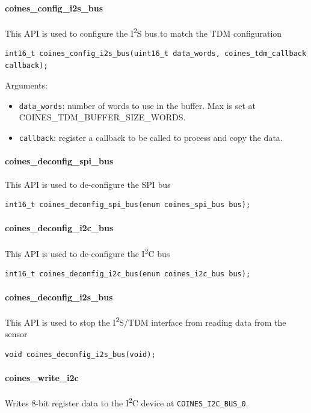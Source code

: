 \paragraph{coines\_config\_i2s\_bus}
This API is used to configure the I\textsuperscript{2}S bus to match the TDM configuration

\begin{lstlisting}
int16_t coines_config_i2s_bus(uint16_t data_words, coines_tdm_callback callback);
\end{lstlisting}

Arguments:
\begin{itemize}
	\item \texttt{data\_words}: number of words to use in the buffer. Max is set at COINES\_TDM\_BUFFER\_SIZE\_WORDS.
	\item \texttt{callback}: register a callback to be called to process and copy the data.
\end{itemize}

\paragraph{coines\_deconfig\_spi\_bus}
This API is used to de-configure the SPI bus

\begin{lstlisting}
int16_t coines_deconfig_spi_bus(enum coines_spi_bus bus);
\end{lstlisting}

\paragraph{coines\_deconfig\_i2c\_bus}
This API is used to de-configure the I\textsuperscript{2}C bus

\begin{lstlisting}
int16_t coines_deconfig_i2c_bus(enum coines_i2c_bus bus);
\end{lstlisting}

\paragraph{coines\_deconfig\_i2s\_bus}
This API is used to stop the I\textsuperscript{2}S/TDM interface from reading data from the sensor

\begin{lstlisting}
void coines_deconfig_i2s_bus(void);
\end{lstlisting}

\paragraph{coines\_write\_i2c}\label{CoinesWriteI2c}
Writes 8-bit register data to the I\textsuperscript{2}C device at \texttt{COINES\_I2C\_BUS\_0}.

